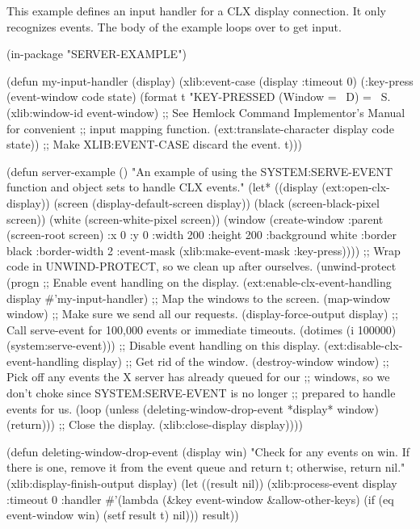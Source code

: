 This example defines an input handler for a CLX display connection.  It only
recognizes  events.  The body of the example loops over
 to get input.

\begin{lisp}
(in-package "SERVER-EXAMPLE")

(defun my-input-handler (display)
  (xlib:event-case (display :timeout 0)
    (:key-press (event-window code state)
     (format t "KEY-PRESSED (Window = ~D) = ~S.~%
                  (xlib:window-id event-window)
             ;; See Hemlock Command Implementor's Manual for convenient
             ;; input mapping function.
             (ext:translate-character display code state))
      ;; Make XLIB:EVENT-CASE discard the event.
      t)))
\end{lisp}

\begin{lisp}
(defun server-example ()
  "An example of using the SYSTEM:SERVE-EVENT function and object sets to
   handle CLX events."
  (let* ((display (ext:open-clx-display))
         (screen (display-default-screen display))
         (black (screen-black-pixel screen))
         (white (screen-white-pixel screen))
         (window (create-window :parent (screen-root screen)
                                :x 0 :y 0 :width 200 :height 200
                                :background white :border black
                                :border-width 2
                                :event-mask
                                (xlib:make-event-mask :key-press))))
    ;; Wrap code in UNWIND-PROTECT, so we clean up after ourselves.
    (unwind-protect
        (progn
          ;; Enable event handling on the display.
          (ext:enable-clx-event-handling display #'my-input-handler)
          ;; Map the windows to the screen.
          (map-window window)
          ;; Make sure we send all our requests.
          (display-force-output display)
          ;; Call serve-event for 100,000 events or immediate timeouts.
          (dotimes (i 100000) (system:serve-event)))
      ;; Disable event handling on this display.
      (ext:disable-clx-event-handling display)
      ;; Get rid of the window.
      (destroy-window window)
      ;; Pick off any events the X server has already queued for our
      ;; windows, so we don't choke since SYSTEM:SERVE-EVENT is no longer
      ;; prepared to handle events for us.
      (loop
       (unless (deleting-window-drop-event *display* window)
        (return)))
      ;; Close the display.
      (xlib:close-display display))))

(defun deleting-window-drop-event (display win)
  "Check for any events on win.  If there is one, remove it from the
   event queue and return t; otherwise, return nil."
  (xlib:display-finish-output display)
  (let ((result nil))
    (xlib:process-event
     display :timeout 0
     :handler #'(lambda (&key event-window &allow-other-keys)
                  (if (eq event-window win)
                      (setf result t)
                      nil)))
    result))
\end{lisp}


